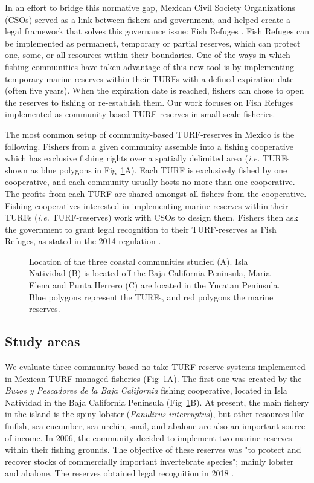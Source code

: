 \documentclass[10pt,letterpaper]{article}
\begin{document}
In an effort to bridge this normative gap, Mexican Civil Society Organizations (CSOs) served as a link between fishers and government, and helped create a legal framework that solves this governance issue: Fish Refuges \cite{nom}. Fish Refuges can be implemented as permanent, temporary or partial reserves, which can protect one, some, or all resources within their boundaries. One of the ways in which fishing communities have taken advantage of this new tool is by implementing temporary marine reserves within their TURFs with a defined expiration date (often five years). When the expiration date is reached, fishers can chose to open the reserves to fishing or re-establish them. Our work focuses on Fish Refuges implemented as community-based TURF-reserves in small-scale fisheries.

The most common setup of community-based TURF-reserves in Mexico is the following. Fishers from a given community assemble into a fishing cooperative which has exclusive fishing rights over a spatially delimited area (\emph{i.e.} TURFs shown as blue polygons in Fig~\ref{fig:map}A). Each TURF is exclusively fished by one cooperative, and each community usually hosts no more than one cooperative. The profits from each TURF are shared amongst all fishers from the cooperative. Fishing cooperatives interested in implementing marine reserves within their TURFs (\emph{i.e.} TURF-reserves) work with CSOs to design them. Fishers then ask the government to grant legal recognition to their TURF-reserves as Fish Refuges, as stated in the 2014 regulation \cite{nom}.

\begin{figure}[!h]
\centering
\caption{Location of the three coastal communities studied (A). Isla Natividad (B) is located off the Baja California Peninsula, Maria Elena and Punta Herrero (C) are located in the Yucatan Peninsula. Blue polygons represent the TURFs, and red polygons the marine reserves.}
\label{fig:map}
\end{figure}

\subsection*{Study areas}

We evaluate three community-based no-take TURF-reserve systems implemented in Mexican TURF-managed fisheries (Fig~\ref{fig:map}A). The first one was created by the \emph{Buzos y Pescadores de la Baja California} fishing cooperative, located in Isla Natividad in the Baja California Peninsula (Fig~\ref{fig:map}B). At present, the main fishery in the island is the spiny lobster (\emph{Panulirus interruptus}), but other resources like finfish, sea cucumber, sea urchin, snail, and abalone are also an important source of income. In 2006, the community decided to implement two marine reserves within their fishing grounds. The objective of these reserves was "to protect and recover stocks of commercially important invertebrate species"; mainly lobster and abalone. The reserves obtained legal recognition in 2018 \cite{dof_website_2018}.
\end{document}
